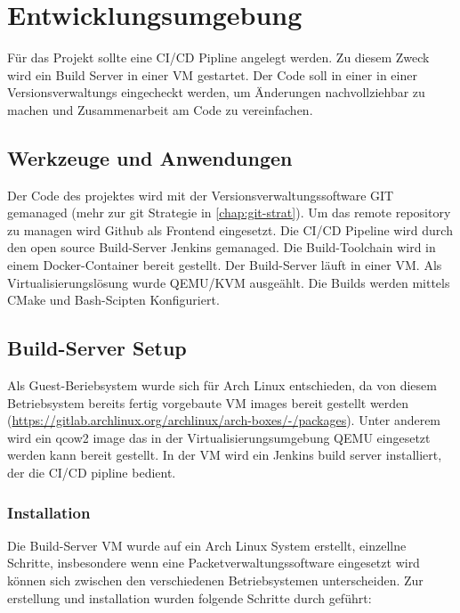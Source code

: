 \chapter{Entwicklungsumgebung}

Für das Projekt sollte eine \acf{CI/CD} Pipline angelegt werden. Zu diesem Zweck wird ein Build Server in einer \acf{VM} gestartet. Der Code soll in einer in einer Versionsverwaltungs eingecheckt werden, um Änderungen nachvollziehbar zu machen und Zusammenarbeit am Code zu vereinfachen.  

\section{Werkzeuge und Anwendungen}

Der Code des projektes wird mit der Versionsverwaltungssoftware GIT gemanaged (mehr zur git Strategie in \autoref{chap:git-strat}). Um das remote repository zu managen wird Github als Frontend eingesetzt. Die \ac{CI/CD} Pipeline wird durch den open source Build-Server Jenkins gemanaged. Die Build-Toolchain wird in einem Docker-Container bereit gestellt. Der Build-Server läuft in einer \ac{VM}. Als Virtualisierungslösung wurde QEMU/KVM ausgeählt. Die Builds werden mittels CMake und Bash-Scipten Konfiguriert.

\section{Build-Server Setup}

Als Guest-Beriebsystem wurde sich für Arch Linux entschieden, da von diesem Betriebsystem bereits fertig vorgebaute \ac{VM} images bereit gestellt werden (\url{https://gitlab.archlinux.org/archlinux/arch-boxes/-/packages}). Unter anderem wird ein qcow2 image das in der Virtualisierungsumgebung QEMU eingesetzt werden kann bereit gestellt.
In der \ac{VM} wird ein Jenkins build server installiert, der die CI/CD pipline bedient.

\subsection{Installation}

Die Build-Server \ac{VM} wurde auf ein Arch Linux System erstellt, einzellne Schritte, insbesondere wenn eine Packetverwaltungssoftware eingesetzt wird können sich zwischen den verschiedenen Betriebsystemen unterscheiden.
Zur erstellung und installation wurden folgende Schritte durch geführt:

